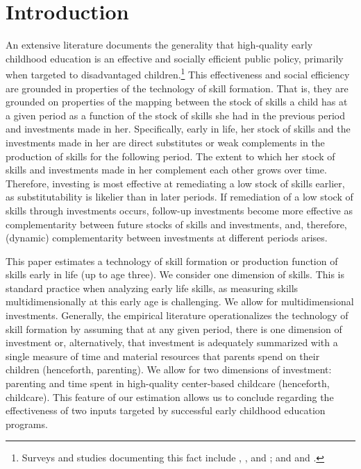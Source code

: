 \pagebreak
{}

\doublespacing
\section{ Introduction} \label{section:intro} 

\noindent An extensive literature documents the generality that high-quality early childhood education is an effective and socially efficient public policy, primarily when targeted to disadvantaged children.\footnote{Surveys and studies documenting this fact include  \citet{cunhaInterpretingEvidenceLife2006}, \citet{Elango_Hojman_etal_2016_Early-Edu}, and \citet{heckmanEconomicsHumanDevelopment2014b}; and \citet{bennhoff2024dynastic} and \citet{garcia2020quantifying}.} This effectiveness and social efficiency are grounded in properties of the technology of skill formation. That is, they are grounded on properties of the mapping between the stock of skills a child has at a given period as a function of the stock of skills she had in the previous period and investments made in her. Specifically, early in life, her stock of skills and the investments made in her are direct substitutes or weak complements in the production of skills for the following period. The extent to which her stock of skills and investments made in her complement each other grows over time. Therefore, investing is most effective at remediating a low stock of skills earlier, as substitutability is likelier than in later periods. If remediation of a low stock of skills through investments occurs, follow-up investments become more effective as complementarity between future stocks of skills and investments, and,  therefore, (dynamic) complementarity between investments at different periods arises.

This paper estimates a technology of skill formation or production function of skills early in life (up to age three). We consider one dimension of skills. This is standard practice when analyzing early life skills, as measuring skills multidimensionally at this early age is challenging. We allow for multidimensional investments. Generally, the empirical literature operationalizes the technology of skill formation by assuming that at any given period, there is one dimension of investment or, alternatively, that investment is adequately summarized with a single measure of time and material resources that parents spend on their children (henceforth, parenting). We allow for two dimensions of investment: parenting and time spent in high-quality center-based childcare (henceforth, childcare). This feature of our estimation allows us to conclude regarding the effectiveness of two inputs targeted by successful early childhood education programs.

